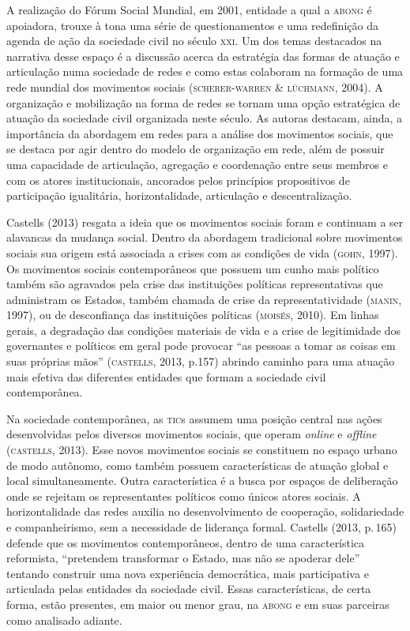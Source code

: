 A realização do Fórum Social Mundial, em 2001, entidade a qual a \textsc{abong} é
apoiadora, trouxe à tona uma série de questionamentos e uma redefinição
da agenda de ação da sociedade civil no século \textsc{xxi}. Um dos temas
destacados na narrativa desse espaço é a discussão acerca da estratégia
das formas de atuação e articulação numa sociedade de redes e como estas
colaboram na formação de uma rede mundial dos movimentos sociais
(\textsc{scherer}-\textsc{warren} \& \textsc{lüchmann}, 2004). A organização e mobilização na forma
de redes se tornam uma opção estratégica de atuação da sociedade civil
organizada neste século. As autoras destacam, ainda, a importância da
abordagem em redes para a análise dos movimentos sociais, que se destaca
por agir dentro do modelo de organização em rede, além de possuir uma
capacidade de articulação, agregação e coordenação entre seus membros e
com os atores institucionais, ancorados pelos princípios propositivos
de participação igualitária, horizontalidade, articulação e
descentralização.

Castells (2013) resgata a ideia que os movimentos sociais foram e
continuam a ser alavancas da mudança social. Dentro da abordagem
tradicional sobre movimentos sociais sua origem está associada a crises
com as condições de vida (\textsc{gohn}, 1997). Os movimentos sociais
contemporâneos que possuem um cunho mais político também são agravados
pela crise das instituições políticas representativas que administram os
Estados, também chamada de crise da representatividade (\textsc{manin}, 1997), ou
de desconfiança das instituições políticas (\textsc{moisés}, 2010). Em linhas
gerais, a degradação das condições materiais de vida e a crise de
legitimidade dos governantes e políticos em geral pode provocar ``as
pessoas a tomar as coisas em suas próprias mãos'' (\textsc{castells}, 2013, p.157)
abrindo caminho para uma atuação mais efetiva das diferentes entidades
que formam a sociedade civil contemporânea.

Na sociedade contemporânea, as \textsc{tic}s assumem uma posição central nas
ações desenvolvidas pelos diversos movimentos sociais, que operam
\textit{online} e \textit{offline} (\textsc{castells}, 2013). Esse novos movimentos sociais se
constituem no espaço urbano de modo autônomo, como também possuem
características de atuação global e local simultaneamente. Outra
característica é a busca por espaços de deliberação onde se rejeitam os
representantes políticos como únicos atores sociais. A horizontalidade
das redes auxilia no desenvolvimento de cooperação, solidariedade e
companheirismo, sem a necessidade de liderança formal. Castells (2013,
p.\,165) defende que os movimentos contemporâneos, dentro de uma
característica reformista, ``pretendem transformar o Estado, mas não se
apoderar dele'' tentando construir uma nova experiência democrática, mais
participativa e articulada pelas entidades da sociedade civil. Essas
características, de certa forma, estão presentes, em maior ou menor
grau, na \textsc{abong} e em suas parceiras como analisado adiante.

